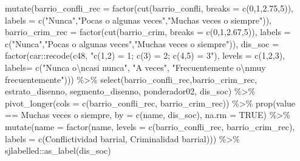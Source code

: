 \documentclass[
  12pt,
]{book}
\newenvironment{Shaded}{\begin{snugshade}}{\end{snugshade}}
\newcommand{\AttributeTok}[1]{\textcolor[rgb]{0.77,0.63,0.00}{#1}}
\newcommand{\ConstantTok}[1]{\textcolor[rgb]{0.00,0.00,0.00}{#1}}
\newcommand{\DecValTok}[1]{\textcolor[rgb]{0.00,0.00,0.81}{#1}}
\newcommand{\FloatTok}[1]{\textcolor[rgb]{0.00,0.00,0.81}{#1}}
\newcommand{\FunctionTok}[1]{\textcolor[rgb]{0.00,0.00,0.00}{#1}}
\newcommand{\NormalTok}[1]{#1}
\newcommand{\SpecialCharTok}[1]{\textcolor[rgb]{0.00,0.00,0.00}{#1}}
\newcommand{\StringTok}[1]{\textcolor[rgb]{0.31,0.60,0.02}{#1}}
\begin{document}
\begin{Shaded}
\begin{Highlighting}[]
  \FunctionTok{mutate}\NormalTok{(}\AttributeTok{barrio\_confli\_rec =} \FunctionTok{factor}\NormalTok{(}\FunctionTok{cut}\NormalTok{(barrio\_confli, }\AttributeTok{breaks =} \FunctionTok{c}\NormalTok{(}\DecValTok{0}\NormalTok{,}\DecValTok{1}\NormalTok{,}\FloatTok{2.75}\NormalTok{,}\DecValTok{5}\NormalTok{)),}
                                    \AttributeTok{labels =} \FunctionTok{c}\NormalTok{(}\StringTok{"Nunca"}\NormalTok{,}\StringTok{"Pocas o algunas veces"}\NormalTok{,}\StringTok{"Muchas veces o siempre"}\NormalTok{)),}
         \AttributeTok{barrio\_crim\_rec =} \FunctionTok{factor}\NormalTok{(}\FunctionTok{cut}\NormalTok{(barrio\_crim, }\AttributeTok{breaks =} \FunctionTok{c}\NormalTok{(}\DecValTok{0}\NormalTok{,}\DecValTok{1}\NormalTok{,}\FloatTok{2.67}\NormalTok{,}\DecValTok{5}\NormalTok{)),}
                                  \AttributeTok{labels =} \FunctionTok{c}\NormalTok{(}\StringTok{"Nunca"}\NormalTok{,}\StringTok{"Pocas o algunas veces"}\NormalTok{,}\StringTok{"Muchas veces o siempre"}\NormalTok{)),}
         \AttributeTok{dis\_soc =} \FunctionTok{factor}\NormalTok{(car}\SpecialCharTok{::}\FunctionTok{recode}\NormalTok{(c48, }\StringTok{"c(1,2) = 1; c(3) = 2; c(4,5) = 3"}\NormalTok{),}
                               \AttributeTok{levels =} \FunctionTok{c}\NormalTok{(}\DecValTok{1}\NormalTok{,}\DecValTok{2}\NormalTok{,}\DecValTok{3}\NormalTok{), }\AttributeTok{labels=} \FunctionTok{c}\NormalTok{(}\StringTok{"Nunca o}\SpecialCharTok{\textbackslash{}n}\StringTok{casi nunca"}\NormalTok{, }\StringTok{"A veces"}\NormalTok{,}
                                         \StringTok{"Frecuentemente o}\SpecialCharTok{\textbackslash{}n}\StringTok{muy frecuentemente"}\NormalTok{))) }\SpecialCharTok{\%\textgreater{}\%}
  \FunctionTok{select}\NormalTok{(barrio\_confli\_rec,barrio\_crim\_rec, estrato\_disenno, segmento\_disenno, ponderador02, dis\_soc) }\SpecialCharTok{\%\textgreater{}\%}
  \FunctionTok{pivot\_longer}\NormalTok{(}\AttributeTok{cols =} \FunctionTok{c}\NormalTok{(barrio\_confli\_rec, barrio\_crim\_rec)) }\SpecialCharTok{\%\textgreater{}\%} 
  \FunctionTok{prop}\NormalTok{(value }\SpecialCharTok{==} \StringTok{\textquotesingle{}Muchas veces o siempre\textquotesingle{}}\NormalTok{, }\AttributeTok{by =} \FunctionTok{c}\NormalTok{(name, dis\_soc), }\AttributeTok{na.rm =} \ConstantTok{TRUE}\NormalTok{) }\SpecialCharTok{\%\textgreater{}\%} 
  \FunctionTok{mutate}\NormalTok{(}\AttributeTok{name =} \FunctionTok{factor}\NormalTok{(name, }\AttributeTok{levels =} \FunctionTok{c}\NormalTok{(}\StringTok{\textquotesingle{}barrio\_confli\_rec\textquotesingle{}}\NormalTok{, }\StringTok{\textquotesingle{}barrio\_crim\_rec\textquotesingle{}}\NormalTok{), }
                       \AttributeTok{labels =} \FunctionTok{c}\NormalTok{(}\StringTok{\textquotesingle{}Conflictividad barrial\textquotesingle{}}\NormalTok{, }\StringTok{\textquotesingle{}Criminalidad barrial\textquotesingle{}}\NormalTok{))) }\SpecialCharTok{\%\textgreater{}\%} 
\NormalTok{  sjlabelled}\SpecialCharTok{::}\FunctionTok{as\_label}\NormalTok{(dis\_soc)}


\end{Highlighting}
\end{Shaded}
\end{document}
